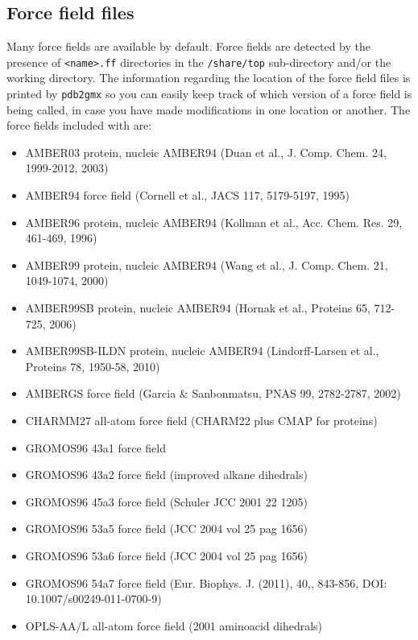 \subsection{Force field files}
\label{subsec:fffiles}
Many force fields are available by default.
Force fields are detected by the presence of {\tt <name>.ff} directories
in the {\gromacs} {\tt /share/top} sub-directory and/or the working directory.
The information regarding the location of the force field files is printed
by {\tt pdb2gmx} so you can easily keep track of which version of a force field
is being called, in case you have made modifications in one location or another.
The force fields included with {\gromacs} are:

{\small
\begin{itemize}
 \item AMBER03 protein, nucleic AMBER94 (Duan et al., J. Comp. Chem. 24, 1999-2012, 2003)
 \item AMBER94 force field (Cornell et al., JACS 117, 5179-5197, 1995)
 \item AMBER96 protein, nucleic AMBER94 (Kollman et al., Acc. Chem. Res. 29, 461-469, 1996)
 \item AMBER99 protein, nucleic AMBER94 (Wang et al., J. Comp. Chem. 21, 1049-1074, 2000)
 \item AMBER99SB protein, nucleic AMBER94 (Hornak et al., Proteins 65, 712-725, 2006)
 \item AMBER99SB-ILDN protein, nucleic AMBER94 (Lindorff-Larsen et al., Proteins 78, 1950-58, 2010)
 \item AMBERGS force field (Garcia \& Sanbonmatsu, PNAS 99, 2782-2787, 2002)
 \item CHARMM27 all-atom force field (CHARM22 plus CMAP for proteins)
 \item GROMOS96 43a1 force field
 \item GROMOS96 43a2 force field (improved alkane dihedrals)
 \item GROMOS96 45a3 force field (Schuler JCC 2001 22 1205)
 \item GROMOS96 53a5 force field (JCC 2004 vol 25 pag 1656)
 \item GROMOS96 53a6 force field (JCC 2004 vol 25 pag 1656)
 \item GROMOS96 54a7 force field (Eur. Biophys. J. (2011), 40,, 843-856, DOI: 10.1007/s00249-011-0700-9)
 \item OPLS-AA/L all-atom force field (2001 aminoacid dihedrals)
\end{itemize}} 
 
